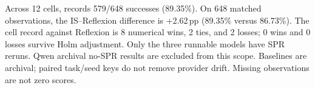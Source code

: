 Across 12 cells, \method records 579/648 successes (89.35\%). On 648 matched observations, the IS--Reflexion difference is +2.62\,pp (89.35\% versus 86.73\%). The cell record against Reflexion is 8 numerical wins, 2 ties, and 2 losses; 0 wins and 0 losses survive Holm adjustment. Only the three runnable models have SPR reruns. Qwen archival no-SPR results are excluded from this scope. Baselines are archival; paired task/seed keys do not remove provider drift. Missing observations are not zero scores.
